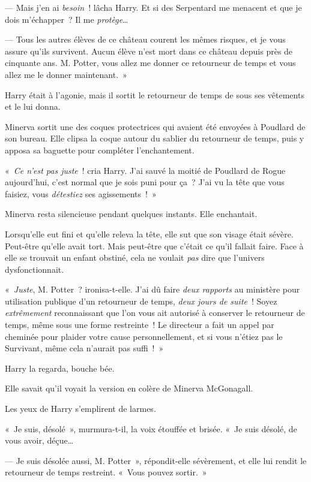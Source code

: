 --- Mais j'en ai \emph{besoin}~! lâcha Harry.
Et si des Serpentard me menacent et que je dois m'échapper~?
Il me \emph{protège}…

--- Tous les autres élèves de ce château courent les mêmes risques, et je vous assure qu'ils survivent.
Aucun élève n'est mort dans ce château depuis près de cinquante ans.
M. Potter, vous allez me donner ce retourneur de temps et vous allez me le donner maintenant.~»

Harry était à l'agonie, mais il sortit le retourneur de temps de sous ses vêtements et le lui donna.

Minerva sortit une des coques protectrices qui avaient été envoyées à Poudlard de son bureau.
Elle clipsa la coque autour du sablier du retourneur de temps, puis y apposa sa baguette pour compléter l'enchantement.

«~\emph{Ce n'est pas juste}~! cria Harry.
J'ai sauvé la moitié de Poudlard de Rogue aujourd'hui, c'est normal que je sois puni pour ça~?
J'ai vu la tête que vous faisiez, vous \emph{détestiez} ses agissements~!~»

Minerva resta silencieuse pendant quelques instants.
Elle enchantait.

Lorsqu'elle eut fini et qu'elle releva la tête, elle sut que son visage était sévère.
Peut-être qu'elle avait tort.
Mais peut-être que c'était ce qu'il fallait faire.
Face à elle se trouvait un enfant obstiné, cela ne voulait \emph{pas} dire que l'univers dysfonctionnait.

«~\emph{Juste}, M. Potter~? ironisa-t-elle.
J'ai dû faire \emph{deux rapports} au ministère pour utilisation publique d'un retourneur de temps, \emph{deux jours de suite}~!
Soyez \emph{extrêmement} reconnaissant que l'on vous ait autorisé à conserver le retourneur de temps, même sous une forme restreinte~!
Le directeur a fait un appel par cheminée pour plaider votre cause personnellement, et si vous n'étiez pas le Survivant, même cela n'aurait pas suffi~!~»

Harry la regarda, bouche bée.

Elle savait qu'il voyait la version en colère de Minerva McGonagall.

Les yeux de Harry s'emplirent de larmes.

«~Je suis, désolé~», murmura-t-il, la voix étouffée et brisée.
«~Je suis désolé, de vous avoir, déçue…

--- Je suis désolée aussi, M. Potter~», répondit-elle sévèrement, et elle lui rendit le retourneur de temps restreint.
«~Vous pouvez sortir.~»

